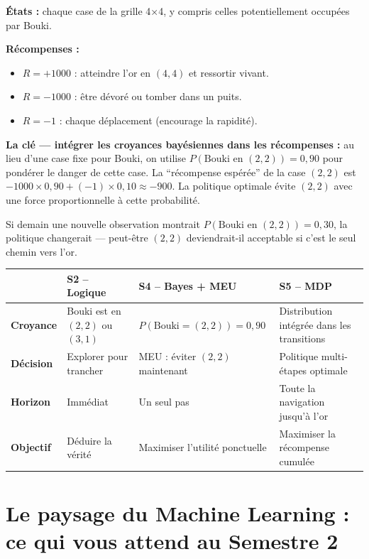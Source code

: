 \documentclass[11pt,a4paper]{article}
\begin{document}
\begin{exemplebox}
\textbf{États :} chaque case de la grille 4×4, y compris celles potentiellement occupées par Bouki.

\textbf{Récompenses :}
\begin{itemize}[nosep]
    \item $R = +1000$ : atteindre l'or en $(4,4)$ et ressortir vivant.
    \item $R = -1000$ : être dévoré ou tomber dans un puits.
    \item $R = -1$ : chaque déplacement (encourage la rapidité).
\end{itemize}

\textbf{La clé --- intégrer les croyances bayésiennes dans les récompenses :} au lieu d'une case fixe pour Bouki, on utilise $P(\text{Bouki en }(2,2)) = 0{,}90$ pour pondérer le danger de cette case. La ``récompense espérée'' de la case $(2,2)$ est $-1000 \times 0{,}90 + (-1) \times 0{,}10 \approx -900$. La politique optimale évite $(2,2)$ avec une force proportionnelle à cette probabilité.

Si demain une nouvelle observation montrait $P(\text{Bouki en }(2,2)) = 0{,}30$, la politique changerait --- peut-être $(2,2)$ deviendrait-il acceptable si c'est le seul chemin vers l'or.
\end{exemplebox}

\begin{center}
\renewcommand{\arraystretch}{1.4}
\begin{tabular}{lp{3.5cm}p{3.5cm}p{3.5cm}}
\toprule
& \textbf{S2 -- Logique} & \textbf{S4 -- Bayes + MEU} & \textbf{S5 -- MDP} \\
\midrule
\textbf{Croyance} & Bouki est en $(2,2)$ ou $(3,1)$ & $P(\text{Bouki}=(2,2))=0{,}90$ & Distribution intégrée dans les transitions \\
\textbf{Décision} & Explorer pour trancher & MEU : éviter $(2,2)$ maintenant & Politique multi-étapes optimale \\
\textbf{Horizon} & Immédiat & Un seul pas & Toute la navigation jusqu'à l'or \\
\textbf{Objectif} & Déduire la vérité & Maximiser l'utilité ponctuelle & Maximiser la récompense cumulée \\
\bottomrule
\end{tabular}
\end{center}

\section{Le paysage du Machine Learning : ce qui vous attend au Semestre 2}
\end{document}
